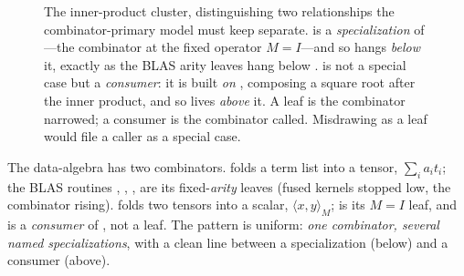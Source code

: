 \begin{figure}[t]
\centering
{}
\caption[\texttt{inner\_product}: specialization versus consumer]{The
inner-product cluster, distinguishing two relationships the combinator-primary
model must keep separate.  is a \emph{specialization} of
---the combinator at the fixed operator $M = I$---and so hangs
\emph{below} it, exactly as the BLAS arity leaves hang below
.  is not a special case but a \emph{consumer}:
it is built \emph{on} , composing a square root after the inner product,
and so lives \emph{above} it. A leaf is the combinator narrowed; a consumer is the
combinator called. Misdrawing  as a leaf would file a caller as a
special case.}
\label{fig:innerprod}
\end{figure}

\begin{keyidea}
The data-algebra has two combinators.  folds a term list
into a tensor, $\sum_i a_i t_i$; the BLAS routines , ,
,  are its fixed-\emph{arity} leaves (fused kernels
stopped low, the combinator rising).  folds two tensors into a
scalar, $\langle x,y\rangle_M$;  is its $M = I$ leaf, and  is
a \emph{consumer} of , not a leaf. The pattern is uniform: \emph{one
combinator, several named specializations}, with a clean line between a
specialization (below) and a consumer (above).
\end{keyidea}

